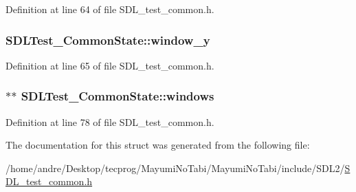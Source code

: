 Definition at line 64 of file S\-D\-L\-\_\-test\-\_\-common.\-h.

\hypertarget{struct_s_d_l_test___common_state_a1fcd61cbe37c2bb563e7b2f1c6853d29}{
\subsubsection[{window\-\_\-y}]{ S\-D\-L\-Test\-\_\-\-Common\-State\-::window\-\_\-y}}\label{struct_s_d_l_test___common_state_a1fcd61cbe37c2bb563e7b2f1c6853d29}


Definition at line 65 of file S\-D\-L\-\_\-test\-\_\-common.\-h.

\hypertarget{struct_s_d_l_test___common_state_a0a054f0c45eb9d21f9561d701e721106}{
\subsubsection[{windows}]{$\ast$$\ast$ S\-D\-L\-Test\-\_\-\-Common\-State\-::windows}}\label{struct_s_d_l_test___common_state_a0a054f0c45eb9d21f9561d701e721106}


Definition at line 78 of file S\-D\-L\-\_\-test\-\_\-common.\-h.



The documentation for this struct was generated from the following file\-:\begin{DoxyCompactItemize}
\item 
/home/andre/\-Desktop/tecprog/\-Mayumi\-No\-Tabi/\-Mayumi\-No\-Tabi/include/\-S\-D\-L2/\hyperlink{_s_d_l__test__common_8h}{S\-D\-L\-\_\-test\-\_\-common.\-h}\end{DoxyCompactItemize}
